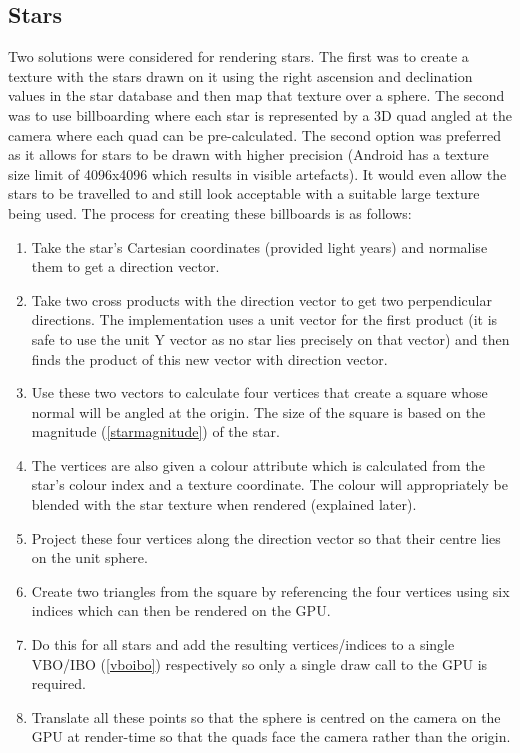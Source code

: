 \subsection{Stars}
\label{starfield}

Two solutions were considered for rendering stars. The first was to create a texture with the stars drawn on it using the right ascension and declination values in the star database and then map that texture over a sphere. The second was to use billboarding where each star is represented by a 3D quad angled at the camera where each quad can be pre-calculated. The second option was preferred as it allows for stars to be drawn with higher precision (Android has a texture size limit of 4096x4096 which results in visible artefacts). It would even allow the stars to be travelled to and still look acceptable with a suitable large texture being used. The process for creating these billboards is as follows:

\singlespacing
\begin{enumerate}
\item Take the star's Cartesian coordinates (provided light years) and normalise them to get a direction vector.
\item Take two cross products with the direction vector to get two perpendicular directions. The implementation uses a unit vector for the first product (it is safe to use the unit Y vector as no star lies precisely on that vector) and then finds the product of this new vector with direction vector.
\item Use these two vectors to calculate four vertices that create a square whose normal will be angled at the origin. The size of the square is based on the magnitude (\cref{starmagnitude}) of the star.
\item The vertices are also given a colour attribute which is calculated from the star's colour index and a texture coordinate. The colour will appropriately be blended with the star texture when rendered (explained later).
\item Project these four vertices along the direction vector so that their centre lies on the unit sphere.
\item Create two triangles from the square by referencing the four vertices using six indices which can then be rendered on the GPU.
\item Do this for all stars and add the resulting vertices/indices to a single VBO/IBO (\cref{vboibo}) respectively so only a single draw call to the GPU is required.
\item Translate all these points so that the sphere is centred on the camera on the GPU at render-time so that the quads face the camera rather than the origin.
\end{enumerate}
\onehalfspacing

